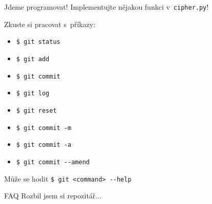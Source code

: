 \documentclass[
]{beamer}
\begin{document}
\begin{frame}{Jdeme programovat!}
Implementujte nějakou funkci v \texttt{cipher.py}!

Zkuste si pracovat s příkazy:

\begin{itemize}
	\item \texttt{\$ git status}
	\item \texttt{\$ git add}
	\item \texttt{\$ git commit}
	\item \texttt{\$ git log}
	\item \texttt{\$ git reset}
	\item \texttt{\$ git commit -m}
	\item \texttt{\$ git commit -a}
	\item \texttt{\$ git commit -{}-amend}
\end{itemize}

\begin{block}{Může se hodit}
\texttt{\$ git <command> -{}-help}
\end{block}

\end{frame}


\begin{frame}{FAQ}
Rozbil jsem si repozitář...
\end{frame}
\end{document}
